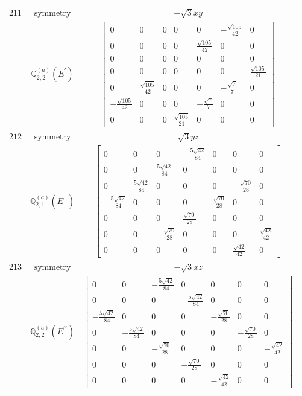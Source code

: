 \documentclass[fleqn,8pt,landscape]{jsarticle}
\begin{document}
\begin{longtable}{ccc}
$ 211 $ & $ \text{symmetry} $ & $ - \sqrt{3} x y $ \\
$  $ & $ \mathbb{Q}_{2,2}^{(a)}(E^{\prime}) $ & $ \begin{bmatrix} 0 & 0 & 0 & 0 & 0 & - \frac{\sqrt{105}}{42} & 0 \\ 0 & 0 & 0 & 0 & \frac{\sqrt{105}}{42} & 0 & 0 \\ 0 & 0 & 0 & 0 & 0 & 0 & 0 \\ 0 & 0 & 0 & 0 & 0 & 0 & \frac{\sqrt{105}}{21} \\ 0 & \frac{\sqrt{105}}{42} & 0 & 0 & 0 & - \frac{\sqrt{7}}{7} & 0 \\ - \frac{\sqrt{105}}{42} & 0 & 0 & 0 & - \frac{\sqrt{7}}{7} & 0 & 0 \\ 0 & 0 & 0 & \frac{\sqrt{105}}{21} & 0 & 0 & 0 \end{bmatrix} $ \\ \hline
$ 212 $ & $ \text{symmetry} $ & $ \sqrt{3} y z $ \\
$  $ & $ \mathbb{Q}_{2,1}^{(a)}(E^{\prime\prime}) $ & $ \begin{bmatrix} 0 & 0 & 0 & - \frac{5 \sqrt{42}}{84} & 0 & 0 & 0 \\ 0 & 0 & \frac{5 \sqrt{42}}{84} & 0 & 0 & 0 & 0 \\ 0 & \frac{5 \sqrt{42}}{84} & 0 & 0 & 0 & - \frac{\sqrt{70}}{28} & 0 \\ - \frac{5 \sqrt{42}}{84} & 0 & 0 & 0 & \frac{\sqrt{70}}{28} & 0 & 0 \\ 0 & 0 & 0 & \frac{\sqrt{70}}{28} & 0 & 0 & 0 \\ 0 & 0 & - \frac{\sqrt{70}}{28} & 0 & 0 & 0 & \frac{\sqrt{42}}{42} \\ 0 & 0 & 0 & 0 & 0 & \frac{\sqrt{42}}{42} & 0 \end{bmatrix} $ \\ \hline
$ 213 $ & $ \text{symmetry} $ & $ - \sqrt{3} x z $ \\
$  $ & $ \mathbb{Q}_{2,2}^{(a)}(E^{\prime\prime}) $ & $ \begin{bmatrix} 0 & 0 & - \frac{5 \sqrt{42}}{84} & 0 & 0 & 0 & 0 \\ 0 & 0 & 0 & - \frac{5 \sqrt{42}}{84} & 0 & 0 & 0 \\ - \frac{5 \sqrt{42}}{84} & 0 & 0 & 0 & - \frac{\sqrt{70}}{28} & 0 & 0 \\ 0 & - \frac{5 \sqrt{42}}{84} & 0 & 0 & 0 & - \frac{\sqrt{70}}{28} & 0 \\ 0 & 0 & - \frac{\sqrt{70}}{28} & 0 & 0 & 0 & - \frac{\sqrt{42}}{42} \\ 0 & 0 & 0 & - \frac{\sqrt{70}}{28} & 0 & 0 & 0 \\ 0 & 0 & 0 & 0 & - \frac{\sqrt{42}}{42} & 0 & 0 \end{bmatrix} $ \\ \hline

\end{longtable}
\end{document}
